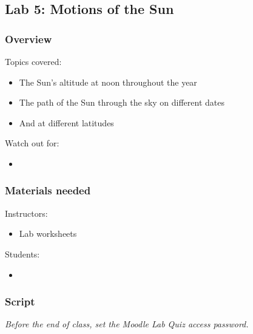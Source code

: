 \documentclass[12pt]{article}
\begin{document}
\newpage
\subsection{Lab 5: Motions of the Sun}

\subsubsection{Overview}

Topics covered:
\begin{itemize}
\item The Sun’s altitude at noon throughout the year
\item The path of the Sun through the sky on different dates \item And at different latitudes
\end{itemize}

\noindent
Watch out for:
\begin{itemize}
\item 
\end{itemize}


\subsubsection{Materials needed}

Instructors:
\begin{itemize}
\item Lab worksheets
\end{itemize}

\noindent
Students:
\begin{itemize}
\item 
\end{itemize}


\subsubsection{Script}


\emph{Before the end of class, set the Moodle Lab Quiz access password.}
\end{document}
